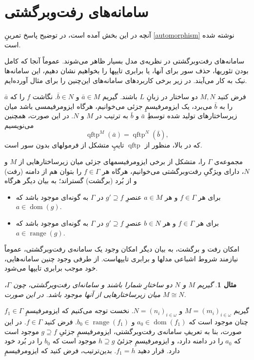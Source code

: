 \documentclass[12pt,a4paper]{report}
\theoremstyle{colorhead}
\newtheorem{mesal}[thm]{مثال}
\DeclareMathOperator{\qftp}{qftp}
\DeclareMathOperator{\dom}{dom}
\DeclareMathOperator{\range}{range}
\begin{document}
\section*{سامانه‌های رفت‌وبرگشتی}
آنچه در این بخش آمده است، در توضیح پاسخ تمرینِ
\ref{automorphism}
نوشته شده است.
\par 
سامانه‌های رفت‌وبرگشتی در نظریه‌ی مدل بسیار ظاهر می‌شوند. 
عموماً آنجا 
 که
کامل بودن تئوریها، حذف سور برای آنها، یا برابری تایپها را بخواهیم نشان دهیم، این سامانه‌ها نیک به کار می‌آیند. در زیر برخی کاربردهای سامانه‌های این‌چنین را برای مثال آورده‌ایم.
\par 
فرض کنید 
$M,N$
دو ساختار در زبانِ
$L$
باشند.
گیریم
$\bar{a}\in M$
و
$\bar{b}\in N$.
نگاشت
$f$
را که
$\bar{a}$
را به
$\bar{b}$
می‌برد، یک ایزومرفیسمِ جزئی می‌خوانیم، هرگاه ایزومرفیمسی باشد میان زیرساختارهای تولید شده توسطِ
$\bar{a}$
و
$\bar{b}$
به ترتیب در
$M$
و
$N$.
در این صورت، همچنین می‌نویسیم
\[
\qftp^M(\bar{a})=\qftp^N(\bar{b}),
\] 
که در بالا، منظور از
$\qftp$
تایپِ متشکل از فرمولهای بدون سور است. 
\par 
مجموعه‌ی
$\Gamma$
را،
متشکل از برخی ایزومرفیسمهای جزئی میان زیرساختارهایی از
$M$
و
$N$،
دارای ویژگیِ رفت‌وبرگشتی می‌خوانیم، هرگاه 
هر 
$f\in \Gamma$
را بتوان هم از دامنه (رفت) و از بُرد (برگشت) گستراند؛ به بیان دیگر هرگاه
\begin{itemize}
\item 
برای هر
$f\in \Gamma$
و 
هر
$a\in M$
عنصرِ
$g'\supseteq f$
در
$\Gamma$
به گونه‌ای موجود باشد که
$a\in \dom(g)$.
\item 
برای هر
$f\in \Gamma$
و 
هر
$b\in N$
عنصرِ
$g'\supseteq f$
در
$\Gamma$
به گونه‌ای موجود باشد که
\mbox{$a\in \range(g)$}.
\end{itemize}
امکان رفت و برگشت، به بیان دیگر امکان وجود یک سامانه‌ی رفت‌وبرگشتی،‌ عموماً
نیازمند شروط اشباعی  مدلها و برابری تایپهاست. از طرفی وجود چنین سامانه‌هایی، خود موجب برابری تایپها می‌شود. 
\begin{mesal}
گیریم
$M$
و
$N$
دو ساختارِ شمارا باشند و 
سامانه‌ای رفت‌وبرگشتی،
چون
$\Gamma$،
 میان زیرساختارهایی از آنها موجود باشد. در این صورت
$M\cong N$.
\end{mesal}
گیریم
$M=(m_i)_{i\in \omega}$
و
$N=(n_i)_{i\in\omega}$.
نخست توجه می‌کنیم که ایزومرفیسمِ
$f_1\in \Gamma$
چنان موجود است که
$a_0\in \dom(f_1)$
و
$
 b_0\in \range(f_1)$.
 فرض کنید
 $f\in \Gamma$.
 در این صورت، بنا به تعریفِ سامانه‌ی رفت‌وبرگشتی،
 ایزومرفیسمِ
 جزئیِ
 $g\supseteq f$
 موجود است که
 $a_0$
 را در دامنه دارد، و ایزومرفیسمِ
 جزئیُ
 $h\supseteq g$
 موجود است که 
 $b_0$
 را در بُرد خود دارد. قرار دهید
 $f_1=h$.
 بدین‌ترتیب، فرض کنید که ایزومرفیسمِ 
\end{document}
